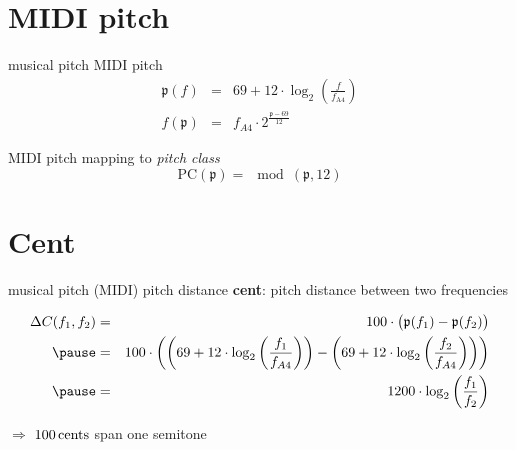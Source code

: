     \section{MIDI pitch}
        \begin{frame}{musical pitch}{ MIDI pitch}
                \begin{eqnarray*}\label{eq:midi_pitch}
                    \mathfrak{p}(f) &=& 69 + 12\cdot\log_2\left(\frac{f}{f_\mathrm{A4}}\right) \\
                    f(\mathfrak{p}) &=& f_{A4}\cdot2^{\frac{\mathfrak{p}-69}{12}}
                \end{eqnarray*}
                
                \pause
                MIDI pitch mapping to \textit{pitch class}
                \begin{equation*}\label{eq:pcidx}
                    \mathrm{PC}(\mathfrak{p}) = \mod(\mathfrak{p}, 12) 
                \end{equation*}
                
        \end{frame}
    
    \section{Cent}
        \begin{frame}{musical pitch}{  (MIDI) pitch distance}
                \textbf{cent}: pitch distance between two frequencies
                \begin{footnotesize}
                \begin{eqnarray*}\label{eq:cent}
                    \Delta C(f_1,f_2)	&=& 100\cdot\big(\mathfrak{p}(f_1) - \mathfrak{p}(f_2)\big)\\
                                        \pause
                                        &=& 100\cdot\left(\left(69 + 12\cdot\log_2\left(\frac{f_1}{f_{A4}}\right)\right) - \left(69 + 12\cdot\log_2\left(\frac{f_2}{f_{A4}}\right)\right)\right)\\
                                        \pause
                                        &=& 1200\cdot\log_2\left( \frac{f_1}{f_2} \right) 
                \end{eqnarray*}
                \end{footnotesize}
                \bigskip
                $\Rightarrow$ $\unit[100]{cents}$ span one semitone
        \end{frame}
        

